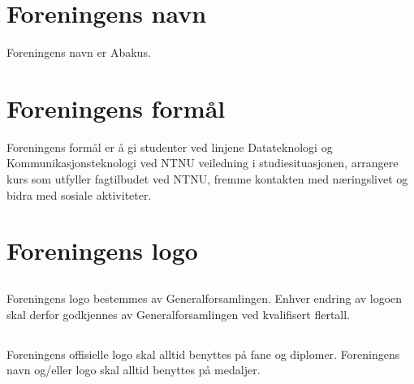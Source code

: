\section{Foreningens navn}
Foreningens navn er Abakus.

\section{Foreningens formål}
Foreningens formål er å gi studenter ved linjene Datateknologi og
Kommunikasjonsteknologi ved NTNU veiledning i studiesituasjonen, arrangere
kurs som utfyller fagtilbudet ved NTNU, fremme kontakten med næringslivet og
bidra med sosiale aktiviteter.

\section{Foreningens logo}

\subsection{}
Foreningens logo bestemmes av Generalforsamlingen. Enhver endring av logoen
skal derfor godkjennes av Generalforsamlingen ved kvalifisert flertall.

\subsection{}
Foreningens offisielle logo skal alltid benyttes på fane og diplomer.
Foreningens navn og/eller logo skal alltid benyttes på medaljer. 


